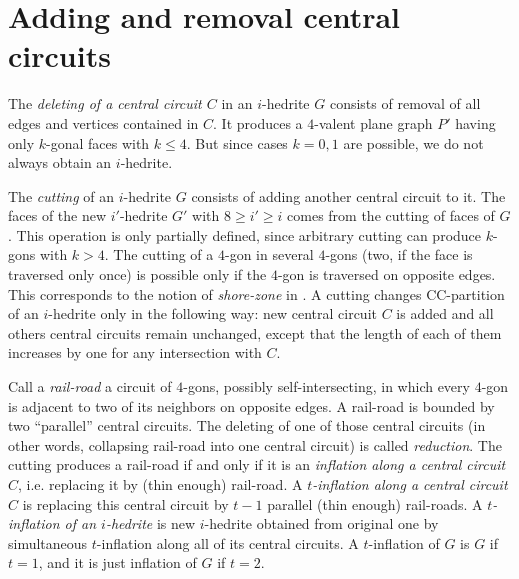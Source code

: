 \documentclass[12pt]{article}
\begin{document}
\section{Adding and removal central circuits}


%
%
%
%
%


The {\em deleting of a central circuit $C$} in an $i$-hedrite $G$ consists 
of removal of all edges and vertices contained in $C$. It produces a 
$4$-valent plane graph $P'$ having only $k$-gonal faces 
with $k \leq 4$. But since cases $k=0,1$ are possible, we do not
always obtain an $i$-hedrite.


The {\em cutting} of an $i$-hedrite $G$ consists of adding another central 
circuit to it. The faces of the new $i'$-hedrite $G'$ with $8\geq i'\geq i$ 
comes from the cutting of faces of $G$. This operation is only partially
defined, since arbitrary cutting can produce $k$-gons with $k>4$. The 
cutting of a $4$-gon in several $4$-gons (two, if the face
is traversed only once) is possible only if the $4$-gon is traversed 
on opposite edges. This corresponds to the notion of {\it shore-zone} 
in \cite{DSt}.
A cutting changes CC-partition of an $i$-hedrite only in the following 
way: new central circuit $C$ is added and all others central circuits 
remain unchanged, except that the length of each of them increases by one 
for any intersection with $C$. 


Call a {\em rail-road} a circuit of $4$-gons, possibly self-intersecting, 
in which every $4$-gon is adjacent to two of its neighbors on opposite
edges. A rail-road is bounded by two ``parallel'' central circuits.
The deleting of  one of those central circuits (in other words, collapsing
rail-road into one central circuit) is called {\em reduction}.
The cutting produces a rail-road if and only if it is an {\em inflation 
along a central circuit $C$}, i.e. replacing it by (thin enough) 
rail-road. A {\em $t$-inflation along a central circuit $C$} is replacing
this central circuit by $t-1$ parallel (thin enough) rail-roads.
A {\em $t$-inflation of an $i$-hedrite} is new $i$-hedrite
obtained from original one by simultaneous $t$-inflation along all
of its central circuits. 
A $t$-inflation of $G$ is $G$ if $t=1$, and it is just inflation of $G$ 
if $t=2$.
\end{document}
